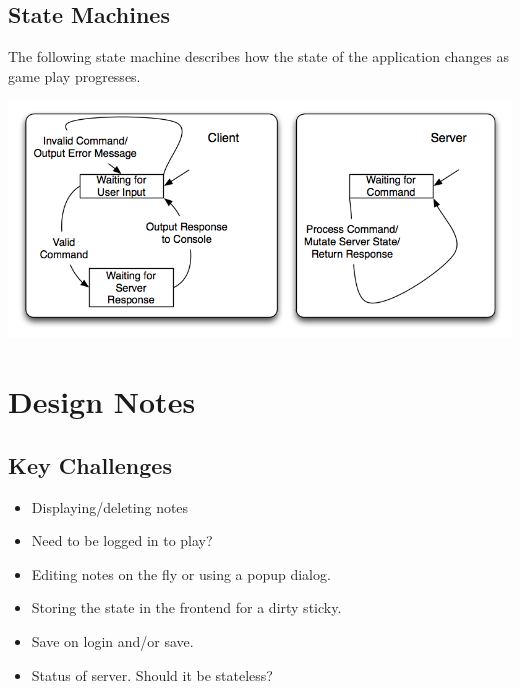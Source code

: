 \documentclass[11pt,letterpaper]{article}
\begin{document}
\subsection{State Machines}
The following state machine describes how the state of the application changes as game play progresses.
\begin{center}
\includegraphics[width=7in]{dot/statediagram.png}
\label{fig:sm1} 
\end{center}

\section{Design Notes}
\subsection{Key Challenges}
\begin{itemize}
\item Displaying/deleting notes
\item Need to be logged in to play?
\item Editing notes on the fly or using a popup dialog.
\item Storing the state in the frontend for a dirty sticky.
\item Save on login and/or save.
\item Status of server. Should it be stateless?
\end{itemize}
\end{document}
